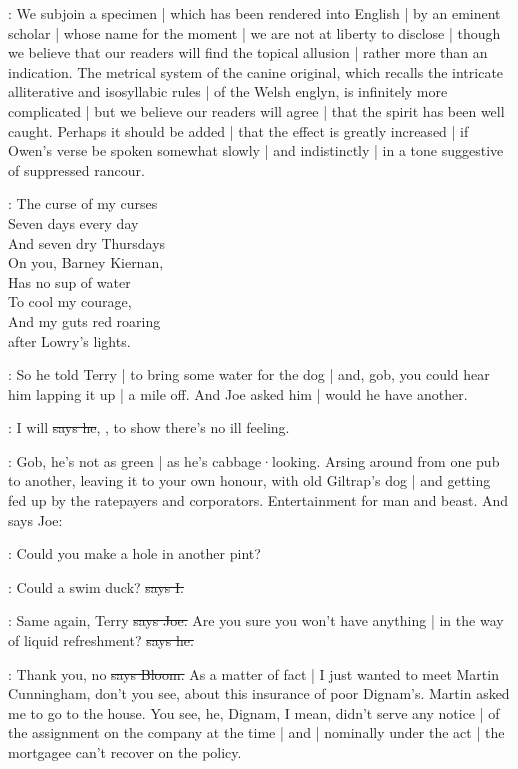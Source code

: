:
We subjoin a specimen |
which has been rendered into English |
by an eminent scholar |
whose name for the moment |
we are not at liberty to disclose |
though we believe that our readers will find the topical allusion |
rather more than an indication.
The metrical system of the canine original,
which recalls the intricate alliterative and isosyllabic rules |
of the Welsh englyn,
is infinitely more complicated |
but we believe our readers will agree |
that the spirit has been well caught.
Perhaps it should be added |
that the effect is greatly increased |
if Owen's verse be spoken somewhat slowly |
and indistinctly |
in a tone suggestive of suppressed rancour.

\garryowen:
    The curse of my curses%
 \\
    Seven days every day\\
    And seven dry Thursdays\\
    On you, Barney Kiernan,\\
    Has no sup of water\\
    To cool my courage,\\
    And my guts red roaring\\
    after Lowry's lights.

\Nq:
So he told Terry |
to bring some water for the dog |
and,
gob,
you could hear him lapping it up |
a mile off.
And Joe asked him |
would he have another.%

\citizen:
I will
\sout{says he},
,
to show there's no ill feeling.

\Nq:
Gob,
he's not as green |
as he's cabbage·looking.
Arsing around from one pub to another,
leaving it to your own honour,
with old Giltrap's dog |
and getting fed up by the ratepayers and corporators.
Entertainment for man and beast.
And says Joe:

\joe:
Could you make a hole in another pint?

:
Could a swim duck?
\sout{says I.}

\joe:
Same again,
Terry
\sout{says Joe.}
Are you sure you won't have anything |
in the way of liquid refreshment?
\sout{says he.}

\Bloom:
Thank you,
no
\sout{says Bloom.}
As a matter of fact |
I just wanted to meet Martin Cunningham,
don't you see,
about this insurance of poor Dignam's.
Martin asked me to go to the house.
You see,
he,
Dignam,
I mean,
didn't serve any notice |
of the assignment on the company at the time |
and |
nominally under the act |
the mortgagee can't recover on the policy.

